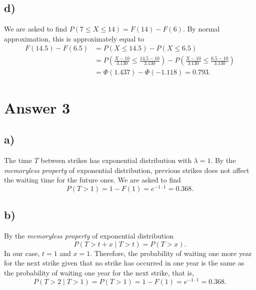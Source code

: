 \documentclass[12pt]{article}
\begin{document}
\subsection*{d)}
\noindent We are asked to find $P(7 \leq X \leq 14) = F(14) - F(6)$. By normal approximation, this is approximately equal to
\begin{align*}
    F(14.5) - F(6.5) &= P(X \leq 14.5) - P(X \leq 6.5) \\
    &= P \left(\frac{X - 10}{3.130} \leq \frac{14.5 - 10}{3.130} \right) - P \left(\frac{X - 10}{3.130} \leq \frac{6.5 - 10}{3.130} \right) \\
    &= \Phi(1.437) - \Phi(-1.118)
    = 0.793.
\end{align*}

\section*{Answer 3}
\subsection*{a)}
\noindent The time $T$ between strikes has exponential distribution with $\lambda = 1$. By the \textit{memoryless property} of exponential distribution, previous strikes does not affect the waiting time for the future ones. We are asked to find
\[
    P(T > 1) = 1 - F(1)
    = e^{-1 \cdot 1}
    = 0.368.
\]

\subsection*{b)}
\noindent By the \textit{memoryless property} of exponential distribution
\[
    P(T > t + x \mid T > t) = P(T > x).
\]
In our case, $t = 1$ and $x = 1$. Therefore, the probability of waiting one more year for the next strike given that no strike has occurred in one year is the same as the probability of waiting one year for the next strike, that is,
\[
    P(T > 2 \mid T > 1) = P(T > 1)
    = 1 - F(1)
    = e^{-1 \cdot 1}
    = 0.368.
\]
\end{document}
